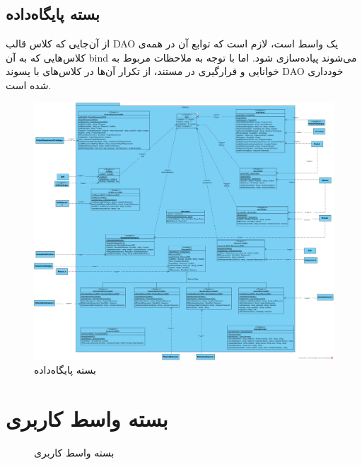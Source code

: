 \begin{landscape}
\section{بسته پایگاه‌داده}
از آن‌جایی که کلاس قالب
 DAO یک واسط است، لازم است که توابع آن در همه‌ی کلاس‌هایی که به آن bind می‌شوند پیاده‌سازی شود. اما با توجه به ملاحظات مربوط به خوانایی و قرارگیری در مستند، از تکرار آن‌ها در کلاس‌های با پسوند DAO خودداری شده است.
\begin{figure}[H]
	\centering
	\includegraphics[scale=0.45]{img/class-design/DatabasePackage}
	\caption{بسته پایگاه‌داده}
\end{figure}
\end{landscape}
\section{بسته واسط کاربری}
\begin{figure}[H]
	\centering
	\caption{بسته واسط کاربری}
\end{figure}
